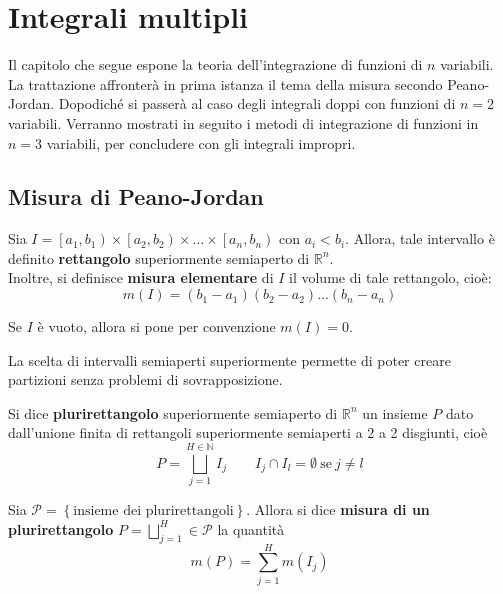 \chapter{Integrali multipli}
Il capitolo che segue espone la teoria dell'integrazione di funzioni di $n$ variabili. La trattazione affronterà in prima istanza il tema della misura secondo Peano-Jordan. Dopodiché si passerà al caso degli integrali doppi con funzioni di $n=2$ variabili. Verranno mostrati in seguito i metodi di integrazione di funzioni in $n=3$ variabili, per concludere con gli integrali impropri.
\section{Misura di Peano-Jordan}
\begin{definition} \label{Def: Rettangolo}
Sia $I=\left[a_1, b_1\right) \times \left[a_2, b_2 \right) \times \dots \times \left[a_n, b_n \right)$ con $a_i < b_i$. Allora, tale intervallo è definito \textbf{rettangolo} superiormente semiaperto di $\mathbb{R}^n$.\\
Inoltre, si definisce \textbf{misura elementare} di $I$ il volume di tale rettangolo, cioè:
\begin{equation*}
    m(I)=\left(b_1-a_1\right)\left(b_2-a_2\right)\dots\left(b_n-a_n\right)
\end{equation*}
\end{definition}
\begin{oss}
    Se $I$ è vuoto, allora si pone per convenzione $m(I)=0$.
\end{oss}
\begin{oss}
    La scelta di intervalli semiaperti superiormente permette di poter creare partizioni senza problemi di sovrapposizione.
\end{oss}
\begin{definition} \label{Def: Plurirettangolo}
    Si dice \textbf{plurirettangolo} superiormente semiaperto di $\mathbb{R}^n$ un insieme $P$ dato dall'unione finita di rettangoli superiormente semiaperti a 2 a 2 disgiunti, cioè
    \begin{equation*}
        P= \bigsqcup_{j=1}^{H \in \mathbb{N}} I_j \qquad I_j \cap I_l = \emptyset\ \text{se}\ j\neq l
    \end{equation*}
\end{definition}
\begin{definition} \label{Def: Misura di un plurirettangolo}
Sia $\mathcal{P}= \left\{\text{insieme dei plurirettangoli}\right\}$. Allora si dice \textbf{misura di un plurirettangolo} $P=\bigsqcup\limits_{j=1}^{H} \in \mathcal{P}$ la quantità
\begin{equation*}
    m(P)= \sum_{j=1}^{H}{m(I_j)}
\end{equation*}
\end{definition}
